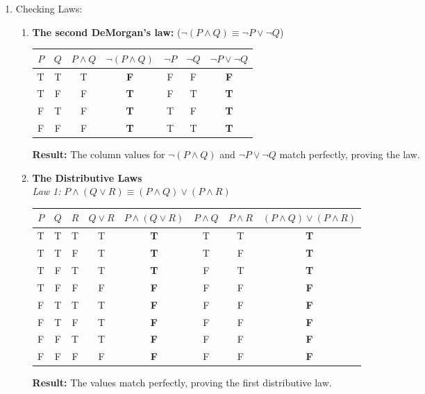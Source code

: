 \begin{enumerate}
\item Checking Laws:
  \begin{enumerate}
  \item \textbf{The second DeMorgan's law:} ($\neg(P \land Q) \equiv \neg P \lor \neg Q$)
    \begin{center}
      \begin{tabular}{ccccccc}
        $P$ & $Q$ & $P \land Q$ & $\neg(P \land Q)$ & $\neg P$ & $\neg Q$ & $\neg P \lor \neg Q$ \\
        \midrule
        T & T & T & \textbf{F} & F & F & \textbf{F} \\
        T & F & F & \textbf{T} & F & T & \textbf{T} \\
        F & T & F & \textbf{T} & T & F & \textbf{T} \\
        F & F & F & \textbf{T} & T & T & \textbf{T}
      \end{tabular}
    \end{center}
    \textbf{Result:} The column values for $\neg(P \land Q)$ and $\neg P \lor \neg Q$ match perfectly, proving the law.

    \item \textbf{The Distributive Laws} \\
    \textit{Law 1:} $P \land (Q \lor R) \equiv (P \land Q) \lor (P \land R)$
    \begin{center}
      \begin{tabular}{cccccccc}
        $P$ & $Q$ & $R$ & $Q \lor R$ & $P \land (Q \lor R)$ & $P \land Q$ & $P \land R$ & $(P \land Q) \lor (P \land R)$ \\
        \midrule
        T & T & T & T & \textbf{T} & T & T & \textbf{T} \\
        T & T & F & T & \textbf{T} & T & F & \textbf{T} \\
        T & F & T & T & \textbf{T} & F & T & \textbf{T} \\
        T & F & F & F & \textbf{F} & F & F & \textbf{F} \\
        F & T & T & T & \textbf{F} & F & F & \textbf{F} \\
        F & T & F & T & \textbf{F} & F & F & \textbf{F} \\
        F & F & T & T & \textbf{F} & F & F & \textbf{F} \\
        F & F & F & F & \textbf{F} & F & F & \textbf{F}
      \end{tabular}
    \end{center}
    \textbf{Result:} The values match perfectly, proving the first distributive law.


\end{enumerate}
\end{enumerate}
